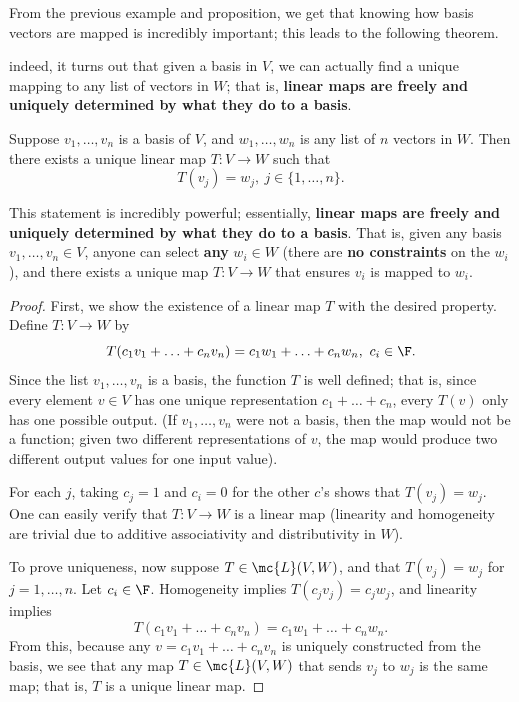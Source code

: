 \documentclass[math0540-lecture-notes.tex]{subfiles}
\begin{document}
From the previous example and proposition, we get that knowing how basis vectors are mapped is
incredibly important; this leads to the following theorem.

indeed, it turns out that given a basis in $V$, we can actually find a unique
mapping to any list of vectors in $W$; that is, \textbf{linear maps are freely and uniquely
determined by what they do to a basis}.

\begin{theorem}{}
  Suppose $v_1,\ldots,v_n$ is a basis of $V$, and $ w_1,\ldots,w_n$ is any list of $n$ vectors
  in $W$. Then there exists a unique linear map $T:V\to W$ such that \[
    T(v_j)=w_j,\ j\in \{ 1,\ldots,n \}
  .\] 
\end{theorem}

This statement is incredibly powerful; essentially, \textbf{linear maps are freely and uniquely
determined by what they do to a basis}. That is, given any basis $v_1,\ldots,v_n\in V$, anyone can
select \textbf{any} $w_i\in W$ (there are \textbf{no constraints} on the $w_i$), and there exists a
unique map $T:V\to W$ that ensures $v_i$ is mapped to $w_i$.

\begin{proof}[Proof]
  First, we show the existence of a linear map $T$ with the desired property. Define $T:V\to W$ by
  \[
    T(c_1v_1+\ldots+c_nv_n)=c_1w_1+\ldots+c_nw_n,\ c_i\in \F
  .\] Since the list $v_1,\ldots,v_n$ is a basis, the function $T$ is well defined; that is, since
  every element $v\in V$ has one unique representation $ c_1+\ldots+c_n$, every $T(v)$ only has one
  possible output. (If $v_1,\ldots,v_n$ were not a basis, then the map would not be a function;
  given two different representations of $v$, the map would produce two different output values for
  one input value).
  
  For each $j$, taking $c_j=1$ and $c_i=0$ for the other $c$'s shows that $T(v_j)=w_j$. One can
  easily verify that $T:V\to W$ is a linear map (linearity and homogeneity are trivial due to additive
  associativity and distributivity in $W$).

  To prove uniqueness, now suppose $T\in \mc{L}(V,W)$, and that $T(v_j)=w_j$ for $j=1,\ldots,n$. Let
  $c_i\in \F$. Homogeneity implies $T(c_jv_j)=c_jw_j$, and linearity implies \[
    T(c_1v_1+\ldots+c_nv_n)=c_1w_1+\ldots+c_nw_n
  .\] From this, because any $v=c_1v_1+\ldots+c_nv_n$ is uniquely constructed from the basis, we see
  that any map $T\in \mc{L}(V,W)$ that sends $v_j$ to $w_j$ is the same map; that is, $T$ is a
  unique linear map.
\end{proof}
\end{document}
